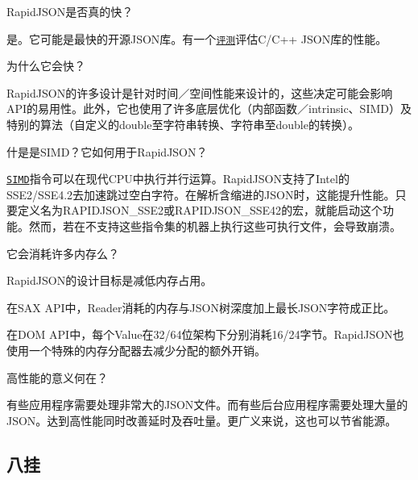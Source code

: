\begin{DoxyEnumerate}
\item Rapid\+J\+S\+O\+N是否真的快？

是。它可能是最快的开源\+J\+S\+O\+N库。有一个\href{https://github.com/miloyip/nativejson-benchmark}{\tt 评测}评估\+C/\+C++ J\+S\+O\+N库的性能。
\item 为什么它会快？

Rapid\+J\+S\+O\+N的许多设计是针对时间／空间性能来设计的，这些决定可能会影响\+A\+P\+I的易用性。此外，它也使用了许多底层优化（内部函数／intrinsic、\+S\+I\+M\+D）及特别的算法（自定义的double至字符串转换、字符串至double的转换）。
\item 什是是\+S\+I\+M\+D？它如何用于\+Rapid\+J\+S\+O\+N？

\href{http://en.wikipedia.org/wiki/SIMD}{\tt S\+I\+MD}指令可以在现代\+C\+P\+U中执行并行运算。\+Rapid\+J\+S\+O\+N支持了\+Intel的\+S\+S\+E2/\+S\+S\+E4.2去加速跳过空白字符。在解析含缩进的\+J\+S\+O\+N时，这能提升性能。只要定义名为{\ttfamily R\+A\+P\+I\+D\+J\+S\+O\+N\+\_\+\+S\+S\+E2}或{\ttfamily R\+A\+P\+I\+D\+J\+S\+O\+N\+\_\+\+S\+S\+E42}的宏，就能启动这个功能。然而，若在不支持这些指令集的机器上执行这些可执行文件，会导致崩溃。
\item 它会消耗许多内存么？

Rapid\+J\+S\+O\+N的设计目标是减低内存占用。

在\+S\+AX A\+P\+I中，{\ttfamily Reader}消耗的内存与\+J\+S\+O\+N树深度加上最长\+J\+S\+O\+N字符成正比。

在\+D\+OM A\+P\+I中，每个{\ttfamily Value}在32/64位架构下分别消耗16/24字节。\+Rapid\+J\+S\+O\+N也使用一个特殊的内存分配器去减少分配的额外开销。
\item 高性能的意义何在？

有些应用程序需要处理非常大的\+J\+S\+O\+N文件。而有些后台应用程序需要处理大量的\+J\+S\+O\+N。达到高性能同时改善延时及吞吐量。更广义来说，这也可以节省能源。
\end{DoxyEnumerate}

\subsection*{八挂}


